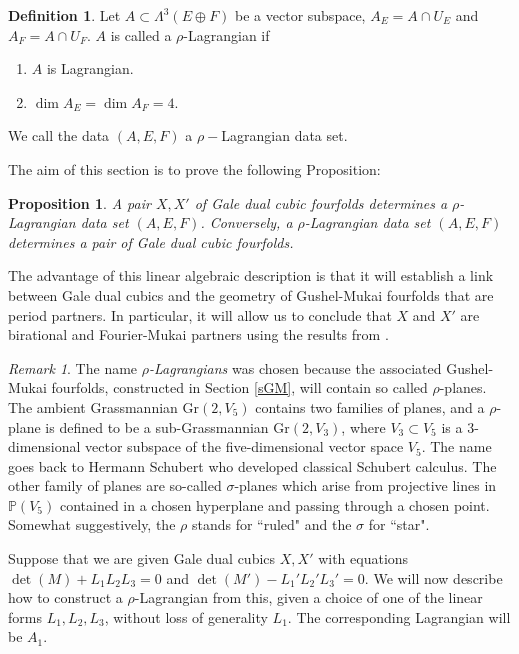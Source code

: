 \documentclass[11pt]{amsart}
\theoremstyle{plain}
\newtheorem{proposition}[theorem]{Proposition}
\numberwithin{equation}{section}
\theoremstyle{definition}
\newtheorem{definition}[theorem]{Definition}
\theoremstyle{remark}
\newtheorem{remark}[theorem]{Remark}
\renewcommand{\P}{\mathbb P}
\newcommand{\Gr}{\mathrm{Gr}}
\begin{document}
\begin{definition}\label{dRhoLagrangian}
Let $A\subset \Lambda^3 (E\oplus F)$ be a vector subspace, 
$A_E = A \cap U_E$ and 
$A_F = A \cap U_F$. $A$ is called a $\rho$-Lagrangian if 
\begin{enumerate}
\item
$A$ is Lagrangian.
\item
$\dim A_E = \dim A_F =4$. 
\end{enumerate}
We call the data $(A,E,F)$ a $\rho-$Lagrangian data set.
\end{definition}

The aim of this section is to prove the following Proposition:
\begin{proposition}
    A pair $X, X'$ of Gale dual cubic fourfolds determines a $\rho$-Lagrangian data set $(A,E,F)$. Conversely, a $\rho$-Lagrangian data set $(A,E,F)$ determines a pair of Gale dual cubic fourfolds.
\end{proposition}
 
The advantage of this linear algebraic description is that it will establish a link between Gale dual cubics and the geometry of Gushel-Mukai fourfolds that are period partners. In particular, it will allow us to conclude that $X$ and $X'$ are birational and Fourier-Mukai partners using the results from \cite{KuzPerryCatCones}. 

\begin{remark}
    The name \textit{$\rho$-Lagrangians} was chosen because the associated Gushel-Mukai fourfolds, constructed in Section \ref{sGM}, will contain so called $\rho$-planes. The ambient Grassmannian $\Gr (2, V_5)$ contains  two families of planes, and a $\rho$-plane is defined to be a sub-Grassmannian $\Gr(2,V_3)$, where $V_3 \subset V_5$ is a 3-dimensional vector subspace of the five-dimensional vector space $V_5$. The name goes back to Hermann Schubert who developed classical Schubert calculus. The other family of planes are so-called $\sigma$-planes which arise from projective lines in $\P (V_5)$ contained in a chosen hyperplane and passing through a chosen point. Somewhat suggestively, the $\rho$ stands for ``ruled" and the $\sigma$ for ``star".
\end{remark}

Suppose that we are given Gale dual cubics $X, X'$ with equations $\det (M) + L_1L_2L_3 =0$ and $\det (M') - L_1'L_2'L_3' =0$. We will now describe how to construct a $\rho$-Lagrangian from this, given a choice of one of the linear forms $L_1, L_2, L_3$, without loss of generality $L_1$. The corresponding Lagrangian will be $A_1$. 
\end{document}
